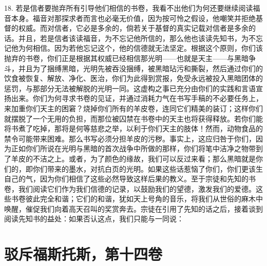 18. 若是信者要抛弃所有引导他们相信的书卷，我看不出他们为何还要继续阅读福音本身。福音对那探求者而言也必毫无价值，因为按可怜之假设，他嘲笑并拒绝基督的权威。而对信者，它必是多余的，倘若关于基督的真实记载对信者是多余的话。并且，若是信者该读福音，为不忘记他所信的，那么他也该读先知书，为不忘记他为何相信。因为若他忘记这个，他的信德就无法坚定。根据这个原则，你们该抛弃的书卷，你们正是根据其权威已经相信那光明——也就是天主——与黑暗争斗，并且为了捆缚黑暗，光明先被吞没捆缚，被黑暗玷污和撕裂，然后通过你们的饮食被恢复、解放、净化、医治，你们为此得到赏报，免受永远被投入黑暗团体的惩罚，与那部分无法被解脱的光明一同。这虚构之事已充分由你们的实践和言语宣扬出来。你们为何寻求书卷的见证，并通过消耗力气在书写手稿的不必要任务上，来加重你们天主的困窘？烧掉你们所有的羊皮卷，连同它们精美的装订；这样你们就摆脱了一个无用的负担，而那位被囚禁在书卷中的天主也将获得释放。若你们能将书煮了吃掉，那将是何等慈悲之举，以利于你们天主的肢体！然而，动物食品的禁令可能带来困难。那么书写必须分担羊皮的污秽。事实上，这应归咎于你们，因为正如你们所说在光明与黑暗的首次战争中所做的那样，你们将笔中洁净之物带到了羊皮的不洁之上。或者，为了颜色的缘故，我们可以反过来看；那么黑暗就是你们的，即你们带来的墨水，对抗白页的光明。如果这些话惹恼了你们，你们更该生自己的气，因为你们相信了这些必然导致这样后果的教义。至于宗徒和先知的书卷，我们阅读它们作为我们信德的记录，以鼓励我们的望德，激发我们的爱德。这些书卷彼此完全和谐；它们的和谐，犹如天上号角的音乐，将我们从世俗的麻木中唤醒，催促我们向着高天召叫的奖赏奔去。宗徒在引用了先知的话之后，接着谈到阅读先知书的益处：如果否认这点，我们只能与一同说：\par



\section{驳斥福斯托斯，第十四卷}

\par

